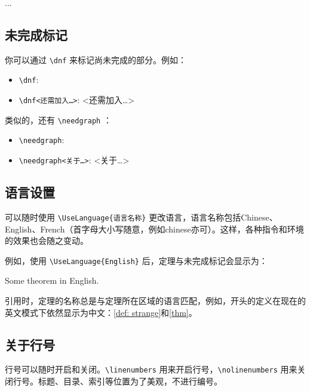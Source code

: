 \documentclass{einfart}
\begin{document}
\begin{proofidea}
    ...
\end{proofidea}

\subsection{未完成标记}

你可以通过 \lstinline|\dnf| 来标记尚未完成的部分。例如：
\begin{itemize}
    \item \lstinline|\dnf|: \quad \dnf
    \item \lstinline|\dnf<还需加入…>|: \quad \dnf<还需加入…>
\end{itemize}

类似的，还有 \lstinline|\needgraph| ：
\begin{itemize}
    \item \lstinline|\needgraph|: \needgraph
    \item \lstinline|\needgraph<关于…>|: \needgraph<关于…>
\end{itemize}

\subsection{语言设置}
可以随时使用 \lstinline|\UseLanguage{语言名称}| 更改语言，语言名称包括Chinese、English、French（首字母大小写随意，例如chinese亦可）。这样，各种指令和环境的效果也会随之变动。

例如，使用 \lstinline|\UseLanguage{English}| 后，定理与未完成标记会显示为：

\begin{theorem}[Useless]\label{thm}
    Some theorem in English. \dnf
\end{theorem}

引用时，定理的名称总是与定理所在区域的语言匹配，例如，开头的定义在现在的英文模式下依然显示为中文：\cref{def: strange}和\cref{thm}。

\subsection{关于行号}
行号可以随时开启和关闭。\lstinline|\linenumbers| 用来开启行号，\lstinline|\nolinenumbers| 用来关闭行号。标题、目录、索引等位置为了美观，不进行编号。
\end{document}
